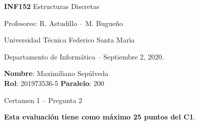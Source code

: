 \documentclass[legalpaper,10pt]{article}
\begin{document}
\thispagestyle{empty}

\begin{minipage}[t]{0.6\textwidth}

{\LARGE \textbf{INF152} Estructuras Discretas}

{\large Profesores: R. Astudillo -- M. Bugueño}

Universidad Técnica Federico Santa Mar\'{\i}a

Departamento de Informática -- Septiembre 2, 2020.

\end{minipage}
\hfill
\begin{minipage}[t]{0.35\textwidth}
\textbf{Nombre}: Maximiliano Sepúlveda\\[0.3cm]
\textbf{Rol}: 201973536-5 \textbf{Paralelo}: 200
\end{minipage}

\vspace{0.8cm}

{\Large Certamen 1 -- Pregunta 2}

\vspace{0.4cm}

\textbf{Esta evaluación tiene como máximo 25 puntos del C1}.
\end{document}
